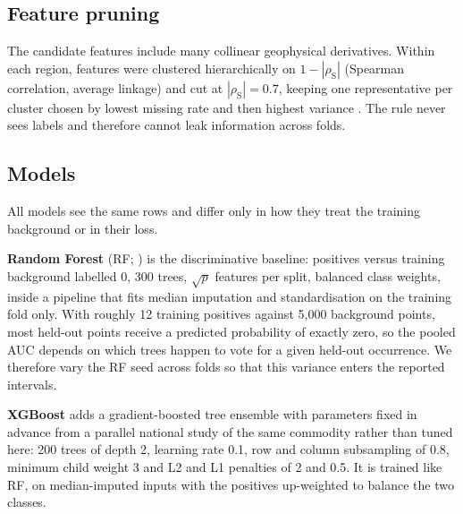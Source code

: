 \documentclass[pdflatex,sn-apa]{sn-jnl}
\begin{document}
\subsection{Feature pruning}\label{sec:pruning}

The candidate features include many collinear geophysical derivatives. Within each region, features were clustered hierarchically on $1-|\rho_{\mathrm{S}}|$ (Spearman correlation, average linkage) and cut at $|\rho_{\mathrm{S}}| = 0.7$, keeping one representative per cluster chosen by lowest missing rate and then highest variance \citep{Dormann2013}. The rule never sees labels and therefore cannot leak information across folds.

\subsection{Models}\label{sec:models}

All models see the same rows and differ only in how they treat the training background or in their loss.

\textbf{Random Forest} (RF; \citealp{Breiman2001}) is the discriminative baseline: positives versus training background labelled 0, 300 trees, $\sqrt{p}$ features per split, balanced class weights, inside a pipeline that fits median imputation and standardisation on the training fold only. With roughly 12 training positives against 5,000 background points, most held-out points receive a predicted probability of exactly zero, so the pooled AUC depends on which trees happen to vote for a given held-out occurrence. We therefore vary the RF seed across folds so that this variance enters the reported intervals.

\textbf{XGBoost} \citep{Chen2016} adds a gradient-boosted tree ensemble with parameters fixed in advance from a parallel national study of the same commodity rather than tuned here: 200 trees of depth 2, learning rate 0.1, row and column subsampling of 0.8, minimum child weight 3 and L2 and L1 penalties of 2 and 0.5. It is trained like RF, on median-imputed inputs with the positives up-weighted to balance the two classes.
\end{document}
